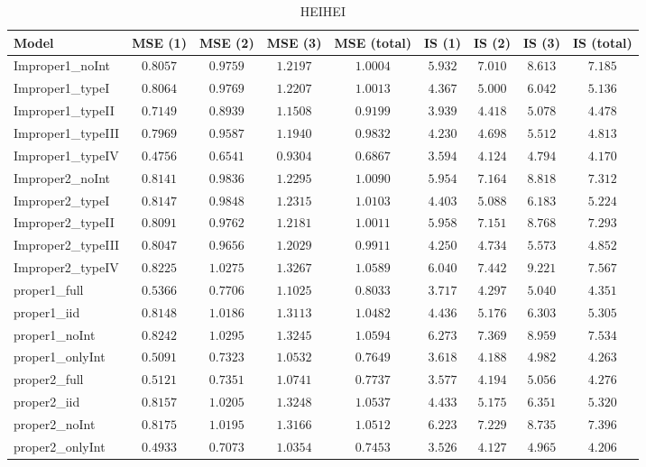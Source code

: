 \begin{table}

\caption{\label{tab:model-choice-sc8}HEIHEI}
\centering
\begin{tabular}{lcccccccc}
\hline
Model  & MSE (1) & MSE (2) & MSE (3) & MSE (total) & IS (1) & IS (2) & IS (3) & \multicolumn{1}{c}{IS (total)} \\ 
\hline
Improper1_noInt  & $0.8057$ & $0.9759$ & $1.2197$ & $1.0004$ & $5.932$ & $7.010$ & $8.613$ & $7.185$ \\
Improper1_typeI  & $0.8064$ & $0.9769$ & $1.2207$ & $1.0013$ & $4.367$ & $5.000$ & $6.042$ & $5.136$ \\
Improper1_typeII  & $0.7149$ & $0.8939$ & $1.1508$ & $0.9199$ & $3.939$ & $4.418$ & $5.078$ & $4.478$ \\
Improper1_typeIII  & $0.7969$ & $0.9587$ & $1.1940$ & $0.9832$ & $4.230$ & $4.698$ & $5.512$ & $4.813$ \\
Improper1_typeIV  & $0.4756$ & $0.6541$ & $0.9304$ & $0.6867$ & $3.594$ & $4.124$ & $4.794$ & $4.170$ \\
Improper2_noInt  & $0.8141$ & $0.9836$ & $1.2295$ & $1.0090$ & $5.954$ & $7.164$ & $8.818$ & $7.312$ \\
Improper2_typeI  & $0.8147$ & $0.9848$ & $1.2315$ & $1.0103$ & $4.403$ & $5.088$ & $6.183$ & $5.224$ \\
Improper2_typeII  & $0.8091$ & $0.9762$ & $1.2181$ & $1.0011$ & $5.958$ & $7.151$ & $8.768$ & $7.293$ \\
Improper2_typeIII  & $0.8047$ & $0.9656$ & $1.2029$ & $0.9911$ & $4.250$ & $4.734$ & $5.573$ & $4.852$ \\
Improper2_typeIV  & $0.8225$ & $1.0275$ & $1.3267$ & $1.0589$ & $6.040$ & $7.442$ & $9.221$ & $7.567$ \\
proper1_full  & $0.5366$ & $0.7706$ & $1.1025$ & $0.8033$ & $3.717$ & $4.297$ & $5.040$ & $4.351$ \\
proper1_iid  & $0.8148$ & $1.0186$ & $1.3113$ & $1.0482$ & $4.436$ & $5.176$ & $6.303$ & $5.305$ \\
proper1_noInt  & $0.8242$ & $1.0295$ & $1.3245$ & $1.0594$ & $6.273$ & $7.369$ & $8.959$ & $7.534$ \\
proper1_onlyInt  & $0.5091$ & $0.7323$ & $1.0532$ & $0.7649$ & $3.618$ & $4.188$ & $4.982$ & $4.263$ \\
proper2_full  & $0.5121$ & $0.7351$ & $1.0741$ & $0.7737$ & $3.577$ & $4.194$ & $5.056$ & $4.276$ \\
proper2_iid  & $0.8157$ & $1.0205$ & $1.3248$ & $1.0537$ & $4.433$ & $5.175$ & $6.351$ & $5.320$ \\
proper2_noInt  & $0.8175$ & $1.0195$ & $1.3166$ & $1.0512$ & $6.223$ & $7.229$ & $8.735$ & $7.396$ \\
proper2_onlyInt  & $0.4933$ & $0.7073$ & $1.0354$ & $0.7453$ & $3.526$ & $4.127$ & $4.965$ & $4.206$ \\
\hline 
\end{tabular}

\end{table}